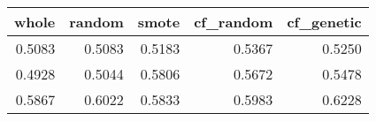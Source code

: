 \begin{tabular}{rrrrr}
\toprule

 whole &  random &  smote &  cf\_random &  cf\_genetic \\
\midrule

0.5083 &  0.5083 & 0.5183 &     0.5367 &      0.5250 \\
0.4928 &  0.5044 & 0.5806 &     0.5672 &      0.5478 \\
0.5867 &  0.6022 & 0.5833 &     0.5983 &      0.6228 \\

\bottomrule
\end{tabular}
